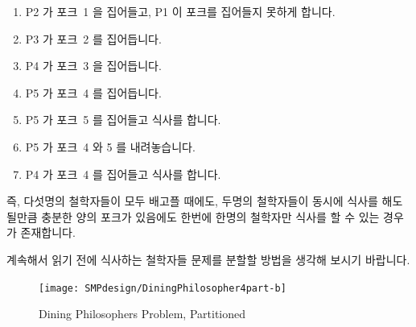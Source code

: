 \begin{enumerate}
\item	P2 가 포크~1 을 집어들고, P1 이 포크를 집어들지 못하게 합니다.
\item	P3 가 포크~2 를 집어듭니다.
\item	P4 가 포크~3 을 집어듭니다.
\item	P5 가 포크~4 를 집어듭니다.
\item	P5 가 포크~5 를 집어들고 식사를 합니다.
\item	P5 가 포크~4 와 5 를 내려놓습니다.
\item	P4 가 포크~4 를 집어들고 식사를 합니다.
\end{enumerate}

즉, 다섯명의 철학자들이 모두 배고플 때에도, 두명의 철학자들이 동시에 식사를
해도 될만큼 충분한 양의 포크가 있음에도 한번에 한명의 철학자만 식사를 할 수
있는 경우가 존재합니다.

계속해서 읽기 전에 식사하는 철학자들 문제를 분할할 방법을 생각해 보시기
바랍니다.

\cleardoublepage


\begin{figure}[tb]
\begin{center}
\texttt{[image: SMPdesign/DiningPhilosopher4part-b]}
\end{center}
\caption{Dining Philosophers Problem, Partitioned}
\end{figure}

